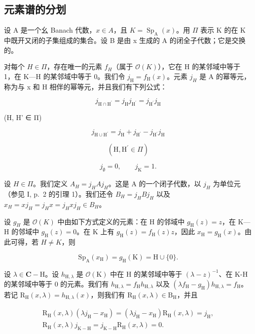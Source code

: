 \subsection{元素谱的分划}

设 A 是一个幺 Banach 代数，\(x \in A\)，且 \(K = \operatorname{Sp}_{\mathrm{A}}(x)\)。用 \(\Pi\) 表示 K 的在 K 中既开又闭的子集组成的集合。设 B 是由 x 生成的 A 的闭全子代数；它是交换的。

对每个 \(H \in \Pi\)，存在唯一的元素 \(f_{H}\)（属于 \(\mathcal{O}(K)\)），它在 H 的某邻域中等于 1，在 K---H 的某邻域中等于 0。我们令 \(j_{\mathrm{H}} = f_{\mathrm{H}}(x)\)。元素 \(j_{H}\) 是 A 的幂等元，称为与 x 和 H 相伴的幂等元，并且我们有下列公式：

\[
j _ {\mathrm{H} \cap \mathrm{H} ^ {\prime}} = j _ {\mathrm{H}} j _ {\mathrm{H} ^ {\prime}} = j _ {\mathrm{H} ^ {\prime}} j _ {\mathrm{H}}\tag{15}
\]

(H, H' ∈ Π)

\[
j _ {\mathrm {H\cup H^ {\prime}}} = j _ {\mathrm{H}} + j _ {\mathrm {H^ {\prime}}} - j _ {\mathrm {H^ {\prime}}} j _ {\mathrm{H}}\tag{16}
\]

\[
(\mathrm{H}, \mathrm{H} ^ {\prime} \in \Pi)
\]

\[
j _ {\emptyset} = 0, \qquad j _ {\mathrm{K}} = 1.
\]

设 \(H \in \Pi\)。我们定义 \(A_{H} = j_{H}Aj_{H}\)。这是 A 的一个闭子代数，以 \(j_{H}\) 为单位元（参见 I, p.~2 的引理 1）。我们还令 \(B_{H} = j_{H}Bj_{H}\) 以及 \(x_{H} = xj_{H} = j_{H}x = j_{H}xj_{H} \in B_{H}\)。

设 \(g_{H}\) 是 \(\mathcal{O}(K)\) 中由如下方式定义的元素：在 H 的邻域中 \(g_{\mathrm{H}}(z)=z\)，在 K---H 的邻域中 \(g_{\mathrm{H}}(z)=0\)。在 K 上有 \(g_{\mathrm{H}}(z)=f_{\mathrm{H}}(z)z\)，因此 \(x_{\mathrm{H}}=g_{\mathrm{H}}(x)\)。由此可得，若 \(H\neq K\)，则

\[
\mathrm{Sp} _ {\mathrm{A}} (x _ {\mathrm{H}}) = g _ {\mathrm{H}} (\mathrm{K}) = \mathrm{H} \cup \{0 \}.
\]

设 \(\lambda \in \mathbf{C} - \mathrm{H}\)。设 \(h_{\mathrm{H},\lambda}\) 是 \(\mathcal{O}(\mathrm{K})\) 中在 H 的某邻域中等于 \((\lambda - z)^{-1}\)、在 K-H 的某邻域中等于 0 的元素。我们有 \(h_{\mathrm{H},\lambda} = f_{\mathrm{H}}h_{\mathrm{H},\lambda}\) 以及 \((\lambda f_{\mathrm{H}} - g_{\mathrm{H}})h_{\mathrm{H},\lambda} = f_{\mathrm{H}}\)。若记 \(\mathrm{R_H}(x,\lambda) = h_{\mathrm{H},\lambda}(x)\)，则我们有 \(\mathrm{R_H}(x,\lambda) \in \mathrm{B_H}\)，并且

\[
\begin{array}{r} \mathrm {R_ {H}} (x, \lambda) (\lambda j _ {\mathrm{H}} - x _ {\mathrm{H}}) = (\lambda j _ {\mathrm{H}} - x _ {\mathrm{H}}) \mathrm {R_ {H}} (x, \lambda) = j _ {\mathrm{H}}, \\ \mathrm {R_ {H}} (x, \lambda) j _ {\mathrm {K-H}} = j _ {\mathrm {K-H}} \mathrm {R_ {H}} (x, \lambda) = 0. \end{array}\tag{17}
\]

